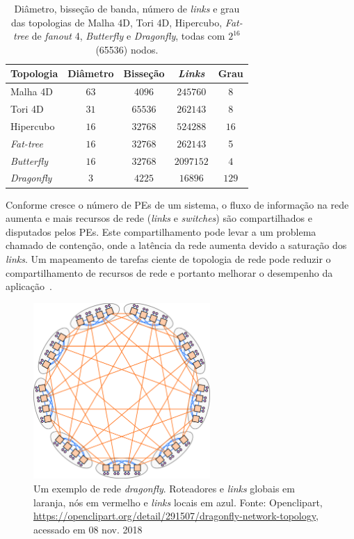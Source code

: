 \documentclass[
	12pt,				%
	openright,			%
	twoside,			%
	a4paper,			%
	english,			%
	brazil,				%
	]{abntex2}
\newcommand{\links}{\textit{links}\xspace}
\newcommand{\Links}{\textit{Links}\xspace}
\newcommand{\Fatt}{\textit{Fat-tree}\xspace}
\newcommand{\dgfly}{\textit{dragonfly}\xspace}
\newcommand{\Dgfly}{\textit{Dragonfly}\xspace}
\newcommand{\switches}{\textit{switches}\xspace}
\begin{document}
\setlength{\tabcolsep}{0.5em}
\begin{table}[!ht]
    \centering
    \begin{tabular}{l c c c c}
        \toprule
        \textbf{Topologia} &    \textbf{Diâmetro} &  \textbf{Bisseção} &   \textbf{\Links} &     \textbf{Grau} \\ \midrule
        Malha 4D & $63$ & $4096$ & $245760$ &  $8$  \\ %
        Tori 4D & $31$ & $65536$ & $262143$ &  $8$  \\ %
        Hipercubo &  $16$ & $32768$ &  $524288$  &  $16$  \\ %
        \Fatt &  $16$ & $32768$ & $262143$ &  5  \\ %
        \textit{Butterfly} & $16$ & $32768$ &  $2097152$ &  $4$  \\ %
        \Dgfly & $3$  & $4225$  &  $ 16896 $ & $129$ \\ \bottomrule
    \end{tabular}
    \caption[Diâmetro, bisseção de banda, número de \links e grau das topologias com 64000 nodos.]{Diâmetro, bisseção de banda, número de \links e grau das topologias de Malha 4D, Tori 4D, Hipercubo, \Fatt de \textit{fanout} 4, \textit{Butterfly} e \Dgfly, todas com $2^{16}$ (65536) nodos.}
    \label{tab:topo_example}
\end{table}


Conforme cresce o número de PEs de um sistema, o fluxo de informação na rede aumenta e mais recursos de rede (\links e \switches) são compartilhados e disputados pelos PEs.
Este compartilhamento pode levar a um problema chamado de contenção, onde a latência da rede aumenta devido a saturação dos \links.
Um mapeamento de tarefas ciente de topologia de rede pode reduzir o compartilhamento de recursos de rede e portanto melhorar o desempenho da aplicação~\cite{bhatele-encyclopedia}.

\begin{figure} [h]
\includegraphics[width=0.6\textwidth]{dragonfly}
\centering
\caption[Um exemplo de rede \dgfly.]{Um exemplo de rede \dgfly. Roteadores e \links globais em laranja, nós em vermelho e \links locais em azul. Fonte: Openclipart, \url{https://openclipart.org/detail/291507/dragonfly-network-topology}, acessado em 08 nov. 2018}
\label{fig:dgfly}
\end{figure}
\end{document}
